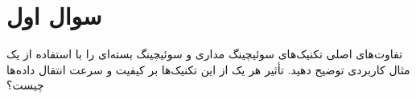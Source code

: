 \section{سوال اول}
تفاوت‌های اصلی تکنیک‌های سوئیچینگ مداری و سوئیچینگ بسته‌ای را با استفاده از یک مثال کاربردی توضیح دهید. تأثیر هر یک از این تکنیک‌ها بر کیفیت و سرعت انتقال داده‌ها چیست؟



\begin{qsolve}
	
	
\end{qsolve}



